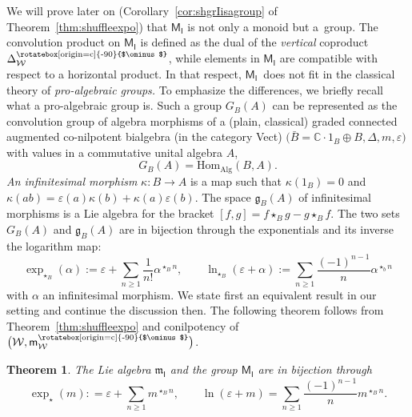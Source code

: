 \documentclass[pdftex]{sigma}
\newcommand\overt{\mathbin{\text{\rotatebox[origin=c]{-90}{$\ominus$}}}}
\newcommand\IWc{\mathcal{W}}
\newcommand{\vcp}{\Delta^{\overt}}
\newcommand\vpS{\mathsf{m}^{\overt}_{\IWc}}
\def\CC{\mathbb{C}}
\newcommand\shgrI{{\mathsf M}_{\mathsf I}}
\newcommand\shalI{{\mathfrak m}_{\mathsf I}}
\numberwithin{equation}{section}
\newtheorem{Theorem}{Theorem}[section]
\begin{document}
We will prove later on (Corollary~\ref{cor:shgrIisagroup} of Theorem~\ref{thm:shuffleexpo}) that $\shgrI$ is not only a monoid but a~group. The convolution product on $\shgrI$ is defined as the dual of the \emph{vertical} coproduct $\vcp_{\IWc}$, while elements in $\shgrI$ are compatible with respect to a horizontal product.
In that respect, $\shgrI$~does not fit in the classical theory of \emph{pro-algebraic groups.} To emphasize the differences, we briefly recall what a pro-algebraic group is.
Such a group $G_B(A)$ can be represented as the convolution group of algebra morphisms of a (plain, classical) graded connected augmented co-nilpotent bialgebra (in the category Vect) $\big(\bar{B} = \CC \cdot 1_B \oplus B, \Delta, m, \varepsilon\big)$ with values in a commutative unital algebra $A$,
			\[
				G_B(A) = \mathrm{Hom}_{\mathrm{Alg}}(B,A).
			\]
			\emph{An infinitesimal morphism} $\kappa\colon B \to A$ is a map such that $\kappa(1_B)=0$ and $\kappa(ab)=\varepsilon(a)\kappa(b) + \kappa(a)\varepsilon(b)$. The space $\mathfrak{g}_B(A)$ of infinitesimal morphisms is a Lie algebra for the bracket $[f,g]=f\star_{B}g-g\star_B f$. The two sets $G_{B}(A)$ and $\mathfrak{g}_B(A)$ are in bijection through the exponentials and its inverse the logarithm map:
			\[
				\exp_{\star_B}(\alpha) := \varepsilon + \sum_{n\geq 1} \frac{1}{n!}\alpha^{\star_B n },\qquad \ln_{\star_B}(\varepsilon + \alpha) := \sum_{n\geq 1} \frac{(-1)^{n-1}}{n}\alpha^{\star_b n}
			\]
			with $\alpha$ an infinitesimal morphism. We state first an equivalent result in our setting and continue the discussion then.
The following theorem follows from Theorem~\ref{thm:shuffleexpo} and conilpotency of~$\big(\mathcal{W},\vpS\big)$.
\begin{Theorem}
	\label{prop:liegroupun}
	The Lie algebra $\shalI$ and the group $\shgrI$ are in bijection through
	\[
		\exp_{\star}(m) : = \varepsilon + \sum_{n\geq 1} m^{\star_B n},\qquad \ln (\varepsilon+m) = \sum_{n\geq 1}\frac{(-1)^{n-1}}{n} m^{\star_B n}.
	\]
\end{Theorem}
\end{document}
